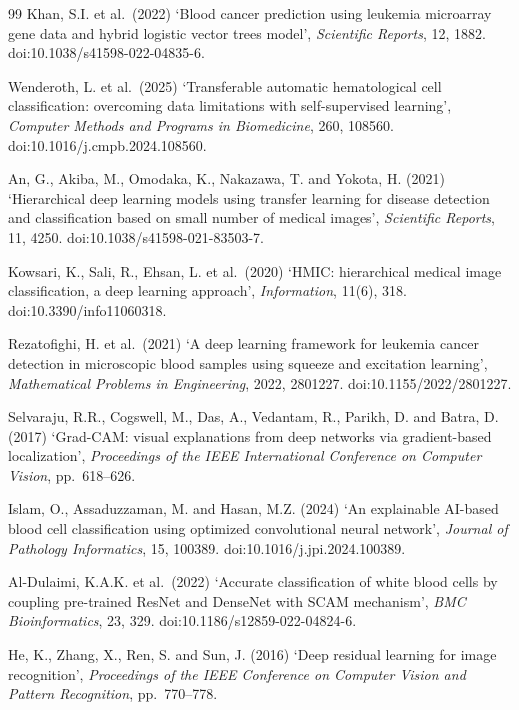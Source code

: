 \documentclass[11pt]{article}
\begin{document}
\begin{thebibliography}{99}
Khan, S.I. et al.\ (2022)
`Blood cancer prediction using leukemia microarray gene data and hybrid logistic
vector trees model', \emph{Scientific Reports}, 12, 1882.
doi:10.1038/s41598-022-04835-6.

Wenderoth, L. et al.\ (2025)
`Transferable automatic hematological cell classification: overcoming data
limitations with self-supervised learning', \emph{Computer Methods and Programs
in Biomedicine}, 260, 108560. doi:10.1016/j.cmpb.2024.108560.

An, G., Akiba, M., Omodaka, K., Nakazawa, T. and Yokota, H. (2021)
`Hierarchical deep learning models using transfer learning for disease detection
and classification based on small number of medical images',
\emph{Scientific Reports}, 11, 4250. doi:10.1038/s41598-021-83503-7.

Kowsari, K., Sali, R., Ehsan, L. et al.\ (2020)
`HMIC: hierarchical medical image classification, a deep learning approach',
\emph{Information}, 11(6), 318. doi:10.3390/info11060318.

Rezatofighi, H. et al.\ (2021)
`A deep learning framework for leukemia cancer detection in microscopic blood
samples using squeeze and excitation learning',
\emph{Mathematical Problems in Engineering}, 2022, 2801227.
doi:10.1155/2022/2801227.

Selvaraju, R.R., Cogswell, M., Das, A., Vedantam, R., Parikh, D. and Batra, D.
(2017) `Grad-CAM: visual explanations from deep networks via gradient-based
localization', \emph{Proceedings of the IEEE International Conference on
Computer Vision}, pp.\ 618--626.

Islam, O., Assaduzzaman, M. and Hasan, M.Z. (2024)
`An explainable AI-based blood cell classification using optimized convolutional
neural network', \emph{Journal of Pathology Informatics}, 15, 100389.
doi:10.1016/j.jpi.2024.100389.

Al-Dulaimi, K.A.K. et al.\ (2022)
`Accurate classification of white blood cells by coupling pre-trained ResNet
and DenseNet with SCAM mechanism', \emph{BMC Bioinformatics}, 23, 329.
doi:10.1186/s12859-022-04824-6.

He, K., Zhang, X., Ren, S. and Sun, J. (2016)
`Deep residual learning for image recognition', \emph{Proceedings of the IEEE
Conference on Computer Vision and Pattern Recognition}, pp.\ 770--778.


\end{thebibliography}
\end{document}
